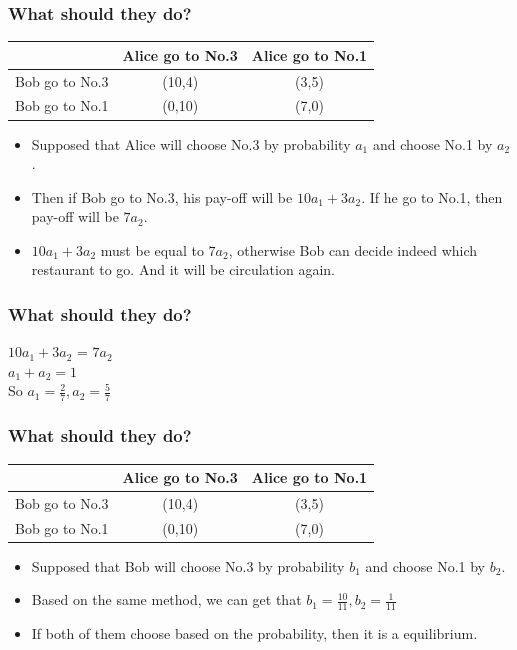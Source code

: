 \documentclass{beamer}
\begin{document}
\begin{frame}
\frametitle{What should they do?}
\begin{tabular}{|c|c|c|}
\hline
\hline
    & {\color{red}Alice} go to No.3 & {\color{red}Alice} go to No.1\\
\hline
{\color{blue}Bob} go to No.3 & ({\color{blue}10},{\color{red}4}) & ({\color{blue}3},{\color{red}5})\\
\hline
{\color{blue}Bob} go to No.1 & ({\color{blue}0},{\color{red}10}) & ({\color{blue}7},{\color{red}0})\\
\hline
\hline
\end{tabular}
\begin{itemize}
\item Supposed that Alice will choose No.3 by probability $a_1$ and choose No.1 by $a_2$.
\item Then if Bob go to No.3, his pay-off will be $10a_1+3a_2$. If he go to No.1, then pay-off will be $7a_2$.
\item $10a_1+3a_2$ must be equal to $7a_2$, otherwise Bob can decide indeed which restaurant to go. And it will be circulation again.\\
\end{itemize}
\end{frame}

\begin{frame}
\frametitle{What should they do?}
        \qquad $10a_1+3a_2$ = $7a_2$ \\
        \qquad $a_1 + a_2 = 1$ \\
        \qquad So $a_1 = \frac{2}{7}, a_2 = \frac{5}{7}$
\end{frame}


\begin{frame}
\frametitle{What should they do?}
\begin{tabular}{|c|c|c|}
\hline
\hline
    & {\color{red}Alice} go to No.3 & {\color{red}Alice} go to No.1\\
\hline
{\color{blue}Bob} go to No.3 & ({\color{blue}10},{\color{red}4}) & ({\color{blue}3},{\color{red}5})\\
\hline
{\color{blue}Bob} go to No.1 & ({\color{blue}0},{\color{red}10}) & ({\color{blue}7},{\color{red}0})\\
\hline
\hline
\end{tabular}
\begin{itemize}
\item Supposed that Bob will choose No.3 by probability $b_1$ and choose No.1 by $b_2$.
\item Based on the same method, we can get that $b_1 = \frac{10}{11},b_2 = \frac{1}{11}$
\item If both of them choose based on the probability, then it is a equilibrium.
\end{itemize}
\end{frame}
\end{document}
